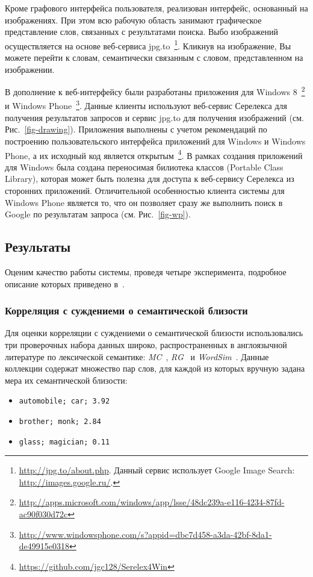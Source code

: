 \documentclass[a4paper,10pt,twoside]{article}
\begin{document}

Кроме графового интерфейса пользователя, реализован интерфейс, основанный на изображениях. При этом всю рабочую область занимают графическое представление слов, связанных с результатами поиска. Выбо изображений осуществляется на основе веб-сервиса jpg.to~\footnote{\url{http://jpg.to/about.php}. Данный сервис использует Google Image Search: \url{http://images.google.ru/}.}. Кликнув на изображение, Вы можете перейти к словам, семантически связанным с словом, представленном на изображении.


В дополнение к веб-интерфейсу были разработаны приложения для Windows 8~\footnote{\url{http://apps.microsoft.com/windows/app/lsse/48dc239a-e116-4234-87fd-ac90f030d72c}} и Windows Phone~\footnote{\url{http://www.windowsphone.com/s?appid=dbc7d458-a3da-42bf-8da1-de49915e0318}}. Данные клиенты используют веб-сервис Серелекса для получения результатов запросов и сервис jpg.to для получения изображений (см. Рис.~\ref{fig-drawing}). Приложения выполнены с учетом рекомендаций по построению пользовательского интерфейса приложений для Windows и Windows Phone, а их исходный код является открытым~\footnote{\url{https://github.com/jgc128/Serelex4Win}}. В рамках создания приложений для Windows была создана переносимая билиотека классов (Portable Class Library), которая может быть полезна для доступа к веб-сервису Серелекса из сторонних приложений. Отличительной особенностью клиента системы для Windows Phone является то, что он позволяет сразу же выполнить поиск в Google по результатам запроса (см. Рис.~\ref{fig-wp}).



\subsection{Результаты}
Оценим качество работы системы, проведя четыре эксперимента, подробное описание которых приведено в~\cite{panchenko2012konvens}.  

\subsubsection{Корреляция с суждениеми о семантической близости} Для оценки корреляции с суждениеми о семантической близости использовались три проверочных набора данных широко, распространенных в англоязычной литературе по лексической семантике: \textit{MC}~\cite{miller1993semantic}, \textit{RG}~\cite{rubenstein1965} и \textit{WordSim}~\cite{finkelstein2001placing}. Данные коллекции содержат множество пар слов, для каждой из которых вручную задана мера их семантической близости:
\begin{itemize}
  \footnotesize
  \item \texttt{automobile; car; 3.92}
  \item \texttt{brother; monk; 2.84}
  \item \texttt{glass; magician; 0.11}
\end{itemize}
\end{document}
